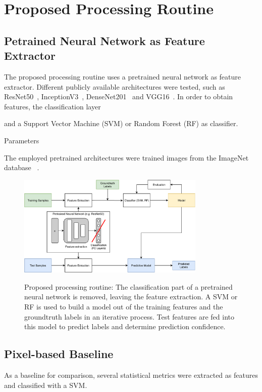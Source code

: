 \documentclass[11pt]{article}
\begin{document}
	
	\section{Proposed Processing Routine}
	
	\subsection{Petrained Neural Network as Feature Extractor}		
	
	The proposed processing routine uses a pretrained neural network as feature extractor. Different publicly available architectures were tested, such as ResNet50~\cite{resnet}, InceptionV3~\cite{inceptionv3}, DenseNet201~\cite{densenet} and VGG16~\cite{vgg}.
	In order to obtain features, the classification layer
	
	 and a Support Vector Machine (SVM) or Random Forest (RF) as classifier.
	

	
	Parameters
	
	The employed pretrained architectures were trained images from the ImageNet database ~\cite{imagenet}. 
	
	\begin{figure}
		\centering		
		\includegraphics[width=0.8\textwidth]{figures/flowchart.pdf}
		\label{fig:flowchart}
		\caption{Proposed processing routine: The classification part of a pretrained neural network is removed, leaving the feature extraction. A SVM or RF is used to build a model out of the training features and the groundtruth labels in an iterative process. Test features are fed into this model to predict labels and determine prediction confidence.}
	\end{figure}

	\subsection{Pixel-based Baseline }
	As a baseline for comparison, several statistical metrics were extracted as features and classified with a SVM.
	
\end{document}
